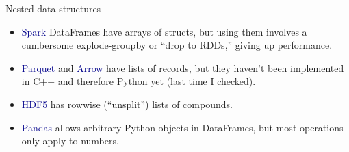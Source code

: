 \documentclass[aspectratio=169]{beamer}
\begin{document}
\begin{frame}{Nested data structures}
\large
\vspace{0.5 cm}
 \hfill {}

\vspace{0.75 cm}
\begin{itemize}\setlength{\itemsep}{0.35 cm}
\item<3-> \textcolor{darkblue}{Spark} DataFrames have arrays of structs, but using them involves a cumbersome explode-groupby or ``drop to RDDs,'' giving up performance.
\item<4-> \textcolor{darkblue}{Parquet} and \textcolor{darkblue}{Arrow} have lists of records, but they haven't been implemented in C++ and therefore Python yet (last time I checked).
\item<5-> \textcolor{darkblue}{HDF5} has rowwise (``unsplit'') lists of compounds.
\item<6-> \textcolor{darkblue}{Pandas} allows arbitrary Python objects in DataFrames, but most operations only apply to numbers.
\end{itemize}
\end{frame}
\end{document}

